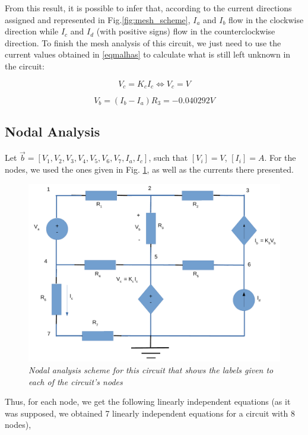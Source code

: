 From this result, it is possible to infer that, according to the current directions assigned and represented in Fig.\ref{fig:mesh_scheme}, $I_a$ and $I_b$ flow in the clockwise direction while $I_c$ and $I_d$ (with positive signs) flow in the counterclockwise direction. To finish the mesh analysis of this circuit, we just need to use the current values obtained in \eqref{eqmalhas} to calculate what is still left unknown in the circuit:

\begin{equation}
    V_c = K_c I_c \Longleftrightarrow V_c = V
\end{equation}

\begin{equation}
    V_b = (I_b - I_a) R_3 = -0.040292V
\end{equation}

\subsection{Nodal Analysis}

Let $\Vec{b} = [V_1, V_2, V_3, V_4, V_5, V_6, V_7, I_a, I_c]$, such that $[V_i] = V$, $[I_i] = A$. For the nodes, we used the ones given in Fig. \ref{fig:nodal_scheme}, as well as the currents there presented. 

\begin{figure}[h]
    \centering
    \includegraphics[width = 0.7\linewidth]{nodal.pdf}
        \caption{\textit{Nodal analysis scheme for this circuit that shows the labels given to each of the circuit's nodes}}
    \label{fig:nodal_scheme}
\end{figure}

Thus, for each node, we get the following linearly independent equations (as it was supposed, we obtained 7 linearly independent equations for a circuit with 8 nodes),

